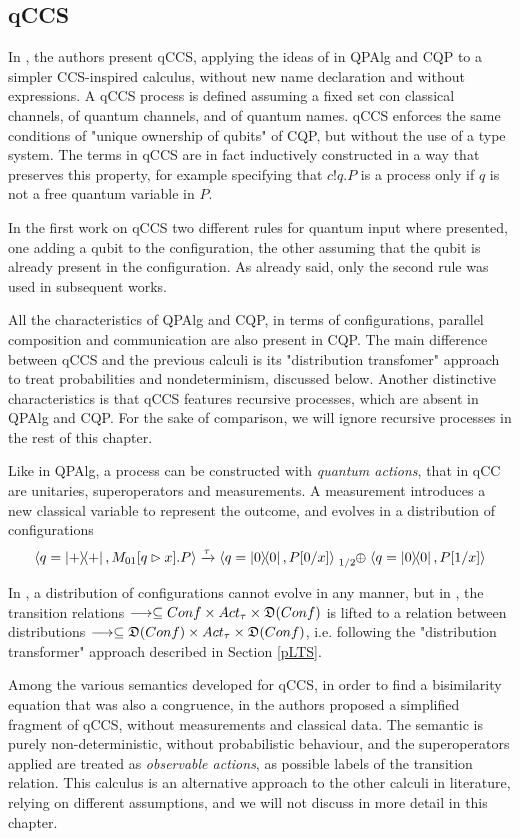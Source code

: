\subsection{qCCS}

In \cite{fengProbabilisticBisimulationsQuantum2007}, the authors present qCCS, applying the ideas of in QPAlg and CQP to a simpler CCS-inspired calculus, without new name declaration and without expressions. A qCCS process is defined assuming a fixed set con classical channels, of quantum channels, and of quantum names. qCCS enforces the same conditions of "unique ownership of qubits" of CQP, but without the use of a type system. The terms in qCCS are in fact inductively constructed in a way that preserves this property, for example specifying that $c!q.P$ is a process only if $q$ is not a free quantum variable in $P$.


In the first work on qCCS two different rules for quantum input where presented, one adding a qubit to the configuration, the other assuming that the qubit is already present in the configuration. As already said, only the second rule was used in subsequent works.


All the characteristics of QPAlg and CQP, in terms of configurations, parallel composition and communication are also present in CQP. The main difference between qCCS and the previous calculi is its "distribution transfomer" approach to treat probabilities and nondeterminism, discussed below. Another distinctive characteristics is that qCCS features recursive processes, which are absent in QPAlg and CQP. For the sake of comparison, we will ignore recursive processes in the rest of this chapter.


Like in QPAlg, a process can be constructed with \textit{quantum actions}, that in qCC  are unitaries, superoperators and measurements. A measurement introduces a new classical variable to represent the outcome, and evolves in a distribution of configurations
\[ \confw{q = \proj{+}, M_{01}[q \rhd x].P} \xrightarrow{\tau} \confw{q = \proj{0}, P[0/x]} \psum{1/2} \confw{q = \proj{0}, P[1/x]} 
\]

In \cite{fengProbabilisticBisimulationsQuantum2007}, a distribution of configurations cannot evolve in any manner, but in \cite{fengBisimulationQuantumProcesses2012, dengOpenBisimulationQuantum2012}, the transition relations $\longrightarrow \subseteq Conf \times Act_\tau \times \mathfrak{D}(Conf)$ is lifted to a relation between distributions $\longrightarrow \subseteq \mathfrak{D}(Conf) \times Act_\tau \times \mathfrak{D}(Conf)$, i.e. following the "distribution transformer" approach described in Section \ref{pLTS}.


Among the various semantics developed for qCCS, in order to find a bisimilarity equation that was also a congruence, in \cite{yingAlgebraQuantumProcesses2010} the authors proposed a simplified fragment of qCCS, without measurements and classical data. The semantic is purely non-deterministic, without probabilistic behaviour, and the superoperators applied are treated as \textit{observable actions}, as possible labels of the transition relation. This calculus is an alternative approach to the other calculi in literature, relying on different assumptions, and we will not discuss in more detail in this chapter.
